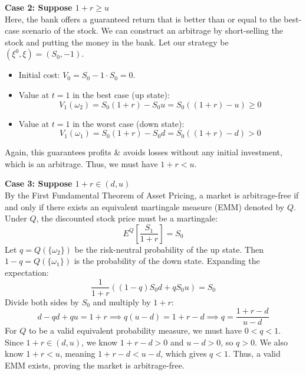\textbf{Case 2: Suppose $1+r \ge u$} \\
Here, the bank offers a guaranteed return that is better than or equal to the best-case scenario of the stock.
We can construct an arbitrage by short-selling the stock and putting the money in the bank. Let our strategy be $(\xi^0, \xi) = (S_0, -1)$.
\begin{itemize}
    \item Initial cost: $V_0 = S_0 - 1 \cdot S_0 = 0$.
    \item Value at $t=1$ in the best case (up state):
    \begin{equation}
        V_1(\omega_2) = S_0(1+r) - S_0 u = S_0((1+r) - u) \ge 0
    \end{equation}
    \item Value at $t=1$ in the worst case (down state):
    \begin{equation}
        V_1(\omega_1) = S_0(1+r) - S_0 d = S_0((1+r) - d) > 0
    \end{equation}
\end{itemize}
Again, this guarantees profits \& avoids losses without any initial investment, which is an arbitrage. Thus, we must have $1+r < u$.

\textbf{Case 3: Suppose $1+r \in (d,u)$} \\
By the First Fundamental Theorem of Asset Pricing, a market is arbitrage-free if and only if there exists an equivalent martingale measure (EMM) denoted by $Q$. Under $Q$, the discounted stock price must be a martingale:
\begin{equation}
    E^Q\left[\frac{S_1}{1+r}\right] = S_0
\end{equation}
Let $q = Q(\{\omega_2\})$ be the risk-neutral probability of the up state. Then $1-q = Q(\{\omega_1\})$ is the probability of the down state. Expanding the expectation:
\begin{equation}
    \frac{1}{1+r} \left( (1-q)S_0 d + q S_0 u \right) = S_0
\end{equation}
Divide both sides by $S_0$ and multiply by $1+r$:
\begin{equation}
    d - qd + qu = 1+r \implies q(u-d) = 1+r-d \implies q = \frac{1+r-d}{u-d}
\end{equation}
For $Q$ to be a valid equivalent probability measure, we must have $0 < q < 1$. 
Since $1+r \in (d,u)$, we know $1+r-d > 0$ and $u-d > 0$, so $q > 0$. We also know $1+r < u$, meaning $1+r-d < u-d$, which gives $q < 1$. Thus, a valid EMM exists, proving the market is arbitrage-free.

